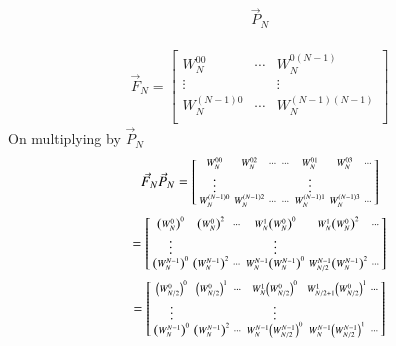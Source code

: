 \documentclass[journal,12pt,twocolumn]{IEEEtran}
\renewcommand\thesection{\arabic{section}}
\begin{document}
\begin{enumerate}[label=\thesection.\arabic*]
\begin{enumerate}[label=\arabic*.,ref=\thesection.\theenumi]
\begin{equation}
		\vec{P}_{N}
	\end{equation}
	\solution \\
	\begin{align}
		\vec{F}_N = \begin{bmatrix}
			W_{N}^{00}	& \cdots & W_{N}^{0(N-1)}\\
			\vdots & & \vdots\\
			W_{N}^{(N-1)0}	& \cdots & W_{N}^{(N-1)(N-1)}\\
		\end{bmatrix}
	\end{align}
	On multiplying by $\vec{P}_{N}$
	\begin{align}
		\vec{F}_N \vec{P}_N  = \begin{bsmallmatrix}
			W_{N}^{00}	&	W_{N}^{02}	&	\cdots	&	\cdots	&	W_{N}^{01}	&	W_{N}^{03}	& \cdots\\
			\vdots	&&&&	\vdots\\
			W_{N}^{(N-1)0}	&	W_{N}^{(N-1)2}	&	\cdots	&	\cdots	&	W_{N}^{(N-1)1}	&	W_{N}^{(N-1)3}	& \cdots
		\end{bsmallmatrix}
	\end{align}
	\begin{align*}
		=\begin{bsmallmatrix}
			\left(W_{N}^{0}\right)^{0}	&	\left(W_{N}^{0}\right)^{2}	&	\cdots	&	W_{N}^1\left(W_{N}^{0}\right)^{0}	&	W_{N}^1\left(W_{N}^{0}\right)^{2}	&	\cdots\\
			\vdots	&&& \vdots\\
			\left(W_{N}^{N-1}\right)^{0}	&	\left(W_{N}^{N-1}\right)^{2}	&	\cdots	&	W_{N}^{N-1}\left(W_{N}^{N-1}\right)^{0}	&	W_{N/2}^{N-1}\left(W_{N}^{N-1}\right)^{2}	&	\cdots\\
		\end{bsmallmatrix}\\
	\end{align*}
	\begin{align}
		=\begin{bsmallmatrix}
			\left(W_{N/2}^{0}\right)^{0}	&	\left(W_{N/2}^{0}\right)^{1}	&	\cdots	&	W_{N}^1\left(W_{N/2}^{0}\right)^{0}	&	W_{N/2+1}^1\left(W_{N/2}^{0}\right)^{1}	&	\cdots\\
			\vdots	&&& \vdots\\
			\left(W_{N}^{N-1}\right)^{0}	&	\left(W_{N}^{N-1}\right)^{2}	&	\cdots	&	W_{N}^{N-1}\left(W_{N/2}^{N-1}\right)^{0}	&	W_{N}^{N-1}\left(W_{N/2}^{N-1}\right)^{1}	&	\cdots		
		\end{bsmallmatrix}
	\end{align}
	\\ \\ \\

\end{enumerate}
\end{enumerate}
\end{document}
